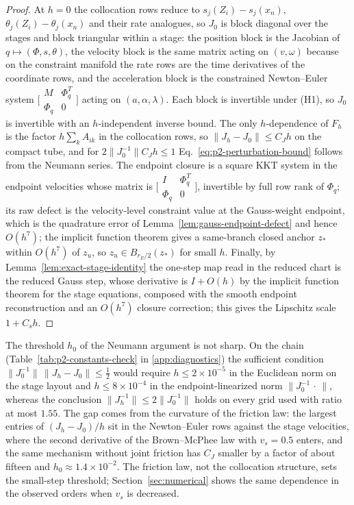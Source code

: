 \documentclass[preprint,12pt]{elsarticle}
\begin{document}
\begin{proof}
At $h=0$ the collocation rows reduce to $s_j(Z_i)-s_j(x_n)$, $\theta_j(Z_i)-\theta_j(x_n)$ and
their rate analogues, so $J_0$ is block diagonal over the stages and block triangular within a
stage: the position block is the Jacobian of $q\mapsto(\Phi,s,\theta)$, the velocity block is the
same matrix acting on $(v,\omega)$ because on the constraint manifold the rate rows are the time
derivatives of the coordinate rows, and the acceleration block is the constrained Newton--Euler
system $\bigl[\begin{smallmatrix}M&\Phi_q^T\\ \Phi_q&0\end{smallmatrix}\bigr]$ acting on
$(a,\alpha,\lambda)$. Each block is invertible under (H1), so $J_0$ is invertible with an
$h$-independent inverse bound. The only $h$-dependence of $F_h$ is the factor $h\sum_kA_{ik}$ in
the collocation rows, so $\|J_h-J_0\|\le C_Jh$ on the compact tube, and for
$2\|J_0^{-1}\|C_Jh\le1$ Eq.~\eqref{eq:p2-perturbation-bound} follows from the Neumann series. The
endpoint closure is a square KKT system in the endpoint velocities whose matrix is
$\bigl[\begin{smallmatrix}I&\Phi_q^T\\ \Phi_q&0\end{smallmatrix}\bigr]$, invertible by full row rank
of $\Phi_q$; its raw defect is the velocity-level constraint value at the Gauss-weight endpoint,
which is the quadrature error of Lemma~\ref{lem:gauss-endpoint-defect} and hence $O(h^7)$; the
implicit function theorem gives a same-branch closed anchor $z_\ast$ within $O(h^7)$ of $z_u$, so
$z_u\in B_{r_E/2}(z_\ast)$ for small $h$. Finally, by Lemma~\ref{lem:exact-stage-identity} the
one-step map read in the reduced chart is the reduced Gauss step, whose derivative is $I+O(h)$ by
the implicit function theorem for the stage equations, composed with the smooth endpoint
reconstruction and an $O(h^7)$ closure correction; this gives the Lipschitz scale $1+C_sh$.
\end{proof}

The threshold $h_0$ of the Neumann argument is not sharp. On the chain
(Table~\ref{tab:p2-constants-check} in \ref{app:diagnostics}) the sufficient condition
$\|J_0^{-1}\|\,\|J_h-J_0\|\le\tfrac12$ would require $h\le2\times10^{-5}$ in the Euclidean norm on
the stage layout and $h\le8\times10^{-4}$ in the endpoint-linearized norm $\|J_0^{-1}\,\cdot\,\|$,
whereas the conclusion $\|J_h^{-1}\|\le2\|J_0^{-1}\|$ holds on every grid used with ratio at most
$1.55$. The gap comes from the curvature of the friction law: the largest entries of $(J_h-J_0)/h$
sit in the Newton--Euler rows against the stage velocities, where the second derivative of the
Brown--McPhee law with $v_s=0.5$ enters, and the same mechanism without joint friction has $C_J$
smaller by a factor of about fifteen and $h_0\approx1.4\times10^{-2}$. The friction law, not the
collocation structure, sets the small-step threshold; Section~\ref{sec:numerical} shows the same
dependence in the observed orders when $v_s$ is decreased.
\end{document}
